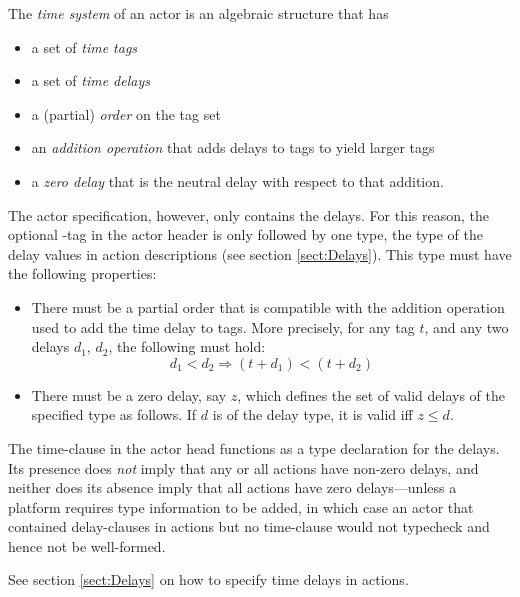 
The {\em time
  system} of an actor is an algebraic structure that has
\begin{itemize}
\item a set of {\em time tags}
\item a set of {\em time delays}
\item a (partial) {\em order} on the tag set
\item an {\em addition operation} that adds delays to tags to yield
  larger tags
\item a {\em zero delay} that is the neutral delay with respect to
  that addition.
\end{itemize}


The actor specification, however, only contains the delays. For this
reason, the optional \kwTime-tag in the actor header is only followed
by one type, the type of the delay values in
action descriptions (see section \ref{sect:Delays}). This type must
have the following properties:
\begin{itemize}
\item There must be a partial order that is compatible with the
  addition operation used to add the time delay to tags. More
  precisely, for any tag $t$, and any two delays $d_1$, $d_2$, the
  following must hold:
  \[d_1 < d_2 \Longrightarrow (t + d_1) < (t + d_2)\]
\item There must be a zero delay, say $z$, which defines the set of
  valid delays of the specified type as follows. If $d$ is of the
  delay type, it is valid iff $z \leq d$.
\end{itemize}

The time-clause in the
actor head functions as a type declaration for the delays. Its
presence does {\em not} imply that any or all actions have non-zero
delays, and neither does its absence imply that all actions have zero
delays---unless a platform requires type information to be added, in
which case an actor that contained delay-clauses in actions but no
time-clause would not typecheck and hence not be well-formed.

See section \ref{sect:Delays} on how to specify time delays in actions.
 





